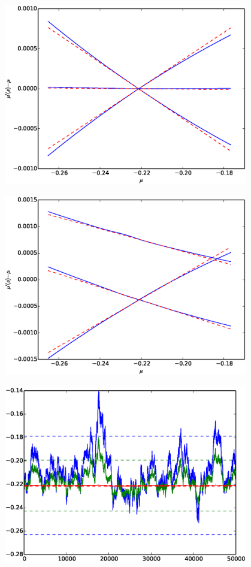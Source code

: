 \documentclass{beamer}
\begin{document}
\begin{frame}
	\begin{center}
		\includegraphics[width = 4.2in]{Images/lin1.eps}
	\end{center}
\end{frame}

\begin{frame}
	\begin{center}
		\includegraphics[width = 4.2in]{Images/lin2.eps}
	\end{center}
\end{frame}

\begin{frame}
	\begin{center}
		\includegraphics[width = 4.2in]{Images/ErgodicBounds.eps}
	\end{center}
\end{frame}
\end{document}

